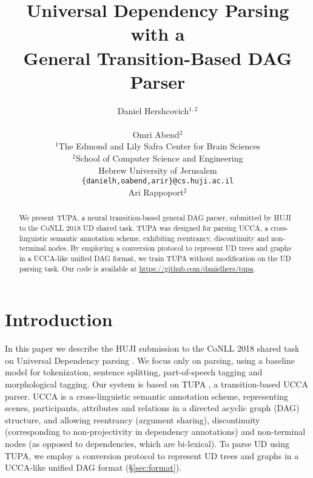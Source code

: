 \documentclass[11pt,a4paper]{article}
\title{Universal Dependency Parsing with a \\ General Transition-Based DAG Parser}
\author{Daniel Hershcovich$^{1,2}$ \\
  \\\And
  Omri Abend$^2$ \\
  $^1$The Edmond and Lily Safra Center for Brain Sciences \\
  $^2$School of Computer Science and Engineering \\
  Hebrew University of Jerusalem \\
  \texttt{\{danielh,oabend,arir\}@cs.huji.ac.il}
  \\\And
  Ari Rappoport$^2$
}
\date{}
\begin{document}
\maketitle
\begin{abstract}
  We present TUPA, a neural transition-based general DAG parser,
  submitted by HUJI to the CoNLL 2018 UD shared task.
  TUPA was designed for parsing UCCA, a cross-linguistic
  semantic annotation scheme, exhibiting
  reentrancy, discontinuity and non-terminal nodes.
  By employing a conversion protocol to represent
  UD trees and graphs in a UCCA-like unified DAG format,
  we train TUPA without modification on the UD parsing task.
  Our code is available at \url{https://github.com/danielhers/tupa}.
\end{abstract}

\section{Introduction}\label{sec:introduction}

In this paper we describe the HUJI submission to the CoNLL 2018 shared task
on Universal Dependency parsing \cite{nivre2016universal,11234/1-2515}.
We focus only on parsing, using a baseline model \cite[UDPipe;][]{udpipe:2017}
for tokenization, sentence splitting, part-of-speech tagging and morphological tagging.
Our system is based on TUPA \cite{hershcovich2017a,hershcovich2018multitask},
a transition-based UCCA parser.
UCCA \cite[Universal Conceptual Cognitive Annotation;][]{abend2013universal} is a
cross-linguistic semantic annotation scheme, representing scenes, participants,
attributes and relations in a directed acyclic graph (DAG) structure,
and allowing reentrancy (argument sharing),
discontinuity (corresponding to non-projectivity in dependency annotations)
and non-terminal nodes (as opposed to dependencies, which are bi-lexical).
To parse UD using TUPA, we employ a conversion protocol to represent
UD trees and graphs in a UCCA-like unified DAG format (\S\ref{sec:format}).
\end{document}
